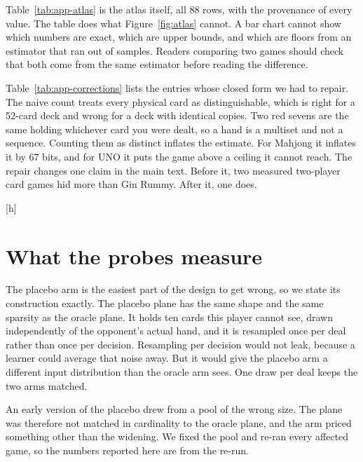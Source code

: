 \documentclass{article}
\makeatletter
\renewenvironment{table}
{\setlength{\abovecaptionskip}{10\p@}%
   \setlength{\belowcaptionskip}{\z@}%
\@float{table}} {\end@float}
\makeatother
\begin{document}
Table~\ref{tab:app-atlas} is the atlas itself, all 88 rows, with the provenance of every value. The table does what Figure~\ref{fig:atlas} cannot. A bar chart cannot show which numbers are exact, which are upper bounds, and which are floors from an estimator that ran out of samples. Readers comparing two games should check that both come from the same estimator before reading the difference.

Table~\ref{tab:app-corrections} lists the entries whose closed form we had to repair. The naive count treats every physical card as distinguishable, which is right for a 52-card deck and wrong for a deck with identical copies. Two red sevens are the same holding whichever card you were dealt, so a hand is a multiset and not a sequence. Counting them as distinct inflates the estimate. For Mahjong it inflates it by 67 bits, and for UNO it puts the game above a ceiling it cannot reach. The repair changes one claim in the main text. Before it, two measured two-player card games hid more than Gin Rummy. After it, one does.

{\scriptsize\setlength{\arrayrulewidth}{0.4pt} }

\begin{table}[h]
  \centering \small
  
  \caption{Closed forms repaired by counting hands as multisets. The distinguishable column is what the standard formula returns, and the multiset column is what the deck actually admits.}
  \label{tab:app-corrections}
\end{table}

\section{What the probes measure}
\label{app:apparatus}

The placebo arm is the easiest part of the design to get wrong, so we state its construction exactly. The placebo plane has the same shape and the same sparsity as the oracle plane. It holds ten cards this player cannot see, drawn independently of the opponent's actual hand, and it is resampled once per deal rather than once per decision. Resampling per decision would not leak, because a learner could average that noise away. But it would give the placebo arm a different input distribution than the oracle arm sees. One draw per deal keeps the two arms matched.

An early version of the placebo drew from a pool of the wrong size. The plane was therefore not matched in cardinality to the oracle plane, and the arm priced something other than the widening. We fixed the pool and re-ran every affected game, so the numbers reported here are from the re-run.
\end{document}
